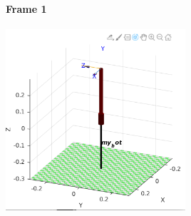 \documentclass{article}
\begin{document}
\paragraph{Frame 1}
\begin{center}
\includegraphics[width=0.5\textwidth]{images/frame1.png}
\end{center}
\end{document}
